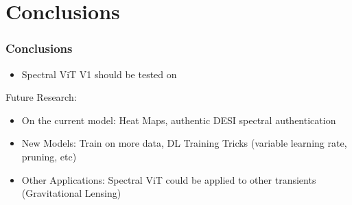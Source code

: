 \section{Conclusions}
\begin{frame}
    \frametitle{Conclusions}
    \begin{itemize}
        \item Spectral ViT V1 should be tested on 
    \end{itemize}
    \pause
    Future Research:
    \begin{itemize}
        \item On the current model: Heat Maps, authentic DESI spectral authentication
        \item New Models: Train on more data, DL Training Tricks (variable learning rate, pruning, etc)
        \item Other Applications: Spectral ViT could be applied to other transients (Gravitational Lensing)
    \end{itemize}
\end{frame}